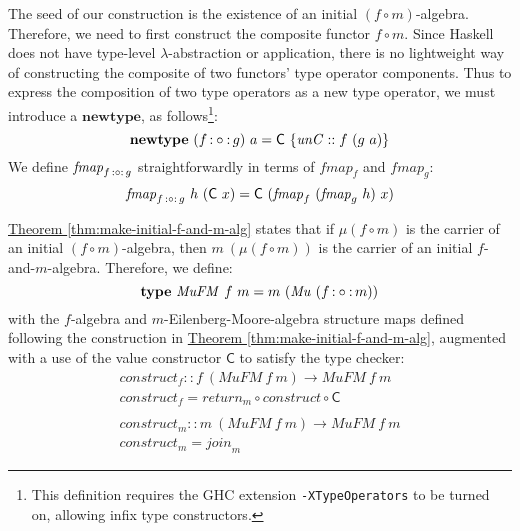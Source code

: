 \documentclass{jfp1}
\newcommand{\thmref}[1]{\hyperref[#1]{Theorem \ref*{#1}}}
\newcommand{\kw}[1]{\textbf{#1}}
\begin{document}
The seed of our construction is the existence of an initial $(f \circ
m)$-algebra. Therefore, we need to first construct the composite
functor $f \circ m$. Since Haskell does not have type-level
$\lambda$-abstraction or application, there is no lightweight way of
constructing the composite of two functors' type operator
components. Thus to express the composition of two type operators as
a new type operator, we must introduce a $\kw{newtype}$, as
follows\footnote{This definition requires the GHC extension
  \texttt{-XTypeOperators} to be turned on, allowing infix type
  constructors.}:
\begin{displaymath}
  \kw{newtype}~(f \fcompose g)~a = \mathsf{C}~\{\mathit{unC} :: f~(g~a) \}
\end{displaymath}
We define $\mathit{fmap}_{f\mathop{\mathord:\circ\mathord:} g}$ straightforwardly in terms of
$\mathit{fmap}_f$ and $\mathit{fmap}_g$:
\begin{displaymath}
  \mathit{fmap}_{f\mathop{\mathord:\circ\mathord:} g}~h~(\mathsf{C}~x) = \mathsf{C}~(\mathit{fmap}_f~(\mathit{fmap}_g~h)~x)
\end{displaymath}

\thmref{thm:make-initial-f-and-m-alg} states that if $\mu(f \circ m)$
is the carrier of an initial $(f \circ m)$-algebra, then $m~(\mu(f
\circ m))$ is the carrier of an initial
$f$-and-$m$-algebra. Therefore, we define:
\begin{displaymath}
  \kw{type}~\mathit{MuFM}~f~m = m~(\mathit{Mu}~(f \fcompose m))
\end{displaymath}
with the $f$-algebra and $m$-Eilenberg-Moore-algebra structure maps
defined following the construction in
\thmref{thm:make-initial-f-and-m-alg}, augmented with a use of the
value constructor $\mathsf{C}$ to satisfy the type checker:
\begin{displaymath}
  \begin{array}{l}
    \mathit{construct}_f :: f~(\mathit{MuFM}~f~m) \to \mathit{MuFM}~f~m \\
    \mathit{construct}_f = \mathit{return}_m \circ \mathit{construct} \circ \mathsf{C} \\
    \\
    \mathit{construct}_m :: m~(\mathit{MuFM}~f~m) \to \mathit{MuFM}~f~m \\
    \mathit{construct}_m = \mathit{join}_m
  \end{array}
\end{displaymath}
\end{document}
